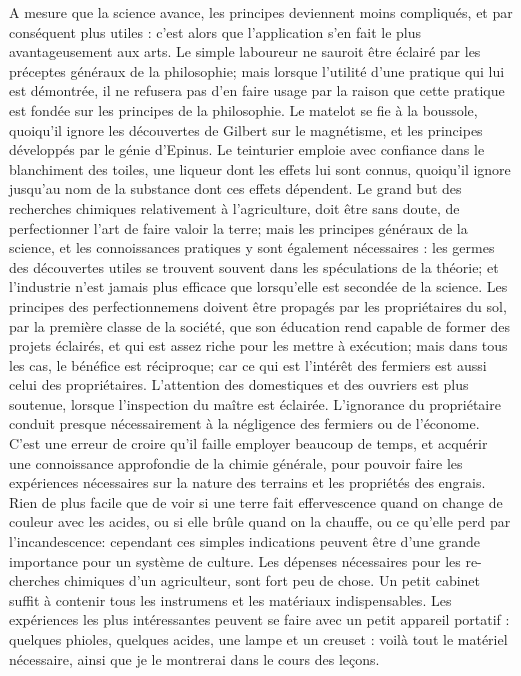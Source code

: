 A mesure que la science avance, les principes deviennent moins compliqués, et par conséquent plus utiles : c'est alors que l'application s'en fait le plus avantageusement aux arts. Le simple laboureur ne sauroit être éclairé par les préceptes généraux de la philosophie; mais lorsque l'utilité d'une pratique qui lui est démontrée, il ne refusera pas d'en faire usage par la raison que cette pratique est fondée sur les principes de la philosophie. Le matelot se fie à la boussole, quoiqu'il ignore les découvertes de Gilbert sur le magnétisme, et les principes développés par le génie d'Epinus. Le teinturier emploie avec confiance dans le blanchiment des toiles, une liqueur dont les effets lui sont connus, quoiqu'il ignore jusqu'au nom de la substance dont ces effets dépendent. Le grand but des recherches chimiques relativement à l'agriculture, doit être sans doute, de perfectionner l'art de faire valoir la terre; mais les principes généraux de la science, et les connoissances pratiques y sont également nécessaires : les germes des découvertes utiles se trouvent souvent dans les spéculations de la théorie; et l'industrie n'est jamais plus\setcounter{page}{356} efficace que lorsqu'elle est secondée de la science.
Les principes des perfectionnemens doivent être propagés par les propriétaires du sol, par la première classe de la société, que son éducation rend capable de former des projets éclairés, et qui est assez riche pour les mettre à exécution; mais dans tous les cas, le bénéfice est réciproque; car ce qui est l'intérêt des fermiers est aussi celui des propriétaires. L'attention des domestiques et des ouvriers est plus soutenue, lorsque l'inspection du maître est éclairée. L'ignorance du propriétaire conduit presque nécessairement à la négligence des fermiers ou de l'économe.
C'est une erreur de croire qu'il faille employer beaucoup de temps, et acquérir une connoissance approfondie de la chimie générale, pour pouvoir faire les expériences nécessaires sur la nature des terrains et les propriétés des engrais. Rien de plus facile que de voir si une terre fait effervescence quand on change de couleur avec les acides, ou si elle brûle quand on la chauffe, ou ce qu'elle perd par l'incandescence: cependant ces simples indications peuvent être d'une grande importance pour un système de culture. Les dépenses nécessaires pour les re-\setcounter{page}{357} cherches chimiques d'un agriculteur, sont fort peu de chose. Un petit cabinet suffit à contenir tous les instrumens et les matériaux indispensables. Les expériences les plus intéressantes peuvent se faire avec un petit appareil portatif : quelques phioles, quelques acides, une lampe et un creuset : voilà tout le matériel nécessaire, ainsi que je le montrerai dans le cours des leçons.
